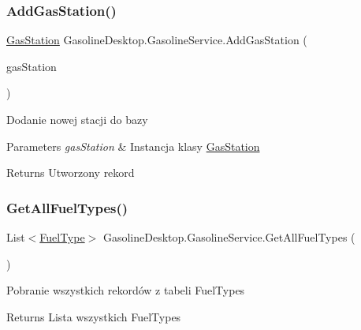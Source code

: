 \subsubsection{\texorpdfstring{AddGasStation()}{AddGasStation()}}
{\footnotesize\ttfamily \mbox{\hyperlink{class_gasoline_desktop_1_1_gas_station}{Gas\+Station}} Gasoline\+Desktop.\+Gasoline\+Service.\+Add\+Gas\+Station (\begin{DoxyParamCaption}\item[{\mbox{\hyperlink{class_gasoline_desktop_1_1_gas_station}{Gas\+Station}}}]{gas\+Station }\end{DoxyParamCaption})}



Dodanie nowej stacji do bazy 


\begin{DoxyParams}{Parameters}
{\em gas\+Station} & Instancja klasy \mbox{\hyperlink{class_gasoline_desktop_1_1_gas_station}{Gas\+Station}}\\
\hline
\end{DoxyParams}
\begin{DoxyReturn}{Returns}
Utworzony rekord
\end{DoxyReturn}
\mbox{\label{class_gasoline_desktop_1_1_gasoline_service_af0f2d5757051b9680eccc8c2a592aaf2}} 
\subsubsection{\texorpdfstring{GetAllFuelTypes()}{GetAllFuelTypes()}}
{\footnotesize\ttfamily List$<$\mbox{\hyperlink{class_gasoline_desktop_1_1_fuel_type}{Fuel\+Type}}$>$ Gasoline\+Desktop.\+Gasoline\+Service.\+Get\+All\+Fuel\+Types (\begin{DoxyParamCaption}{ }\end{DoxyParamCaption})}



Pobranie wszystkich rekordów z tabeli Fuel\+Types 

\begin{DoxyReturn}{Returns}
Lista wszystkich Fuel\+Types
\end{DoxyReturn}
\mbox{\label{class_gasoline_desktop_1_1_gasoline_service_a646a98b8e8448ae95039893eeacb4607}} 
